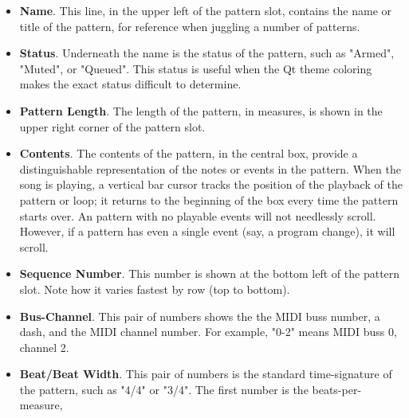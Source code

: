    \begin{itemize}
      \item \textbf{Name}.
         This line, in the upper left of the pattern slot, contains the name or
         title of the pattern, for reference when juggling a number of
         patterns.
      \item \textbf{Status}.
         Underneath the name is the status of the pattern, such as "Armed",
         "Muted", or "Queued".
         This status is useful when the Qt theme coloring makes the exact
         status difficult to determine.
      \item \textbf{Pattern Length}.
         The length of the pattern, in measures, is shown in the upper
         right corner of the pattern slot.
      \item \textbf{Contents}.
         The contents of the pattern, in the central box,
         provide a distinguishable representation of the notes or events in the
         pattern.  When the song is playing, a vertical bar cursor
         tracks the position of the playback of the pattern or loop; it
         returns to the beginning of the box every time the pattern starts
         over.
         An pattern with no playable events will not needlessly scroll.
         However, if a pattern has even a single event (say, a program change),
         it will scroll.
      \item \textbf{Sequence Number}.
         This number is shown at the bottom left of the pattern slot.
         Note how it varies fastest by row (top to bottom).
      \item \textbf{Bus-Channel}.
         This pair of numbers shows the the MIDI buss number, a dash, and
         the MIDI channel number.
         For example, "0-2" means MIDI buss 0, channel 2.
      \item \textbf{Beat/Beat Width}.
         This pair of numbers is the standard time-signature of the pattern,
         such as "4/4" or "3/4".  The first number is the beats-per-measure,

\end{itemize}
